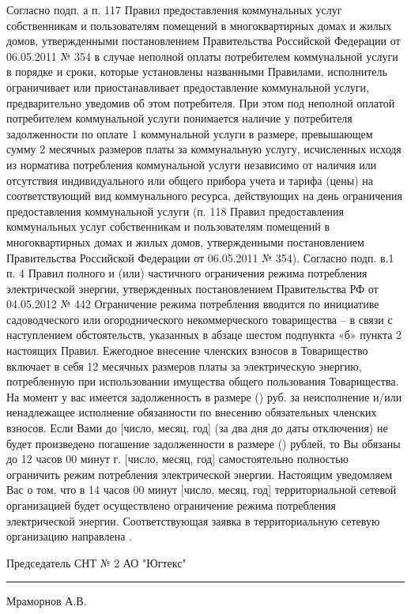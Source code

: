 Согласно подп. а п. 117 Правил предоставления коммунальных услуг собственникам и пользователям помещений в многоквартирных домах и жилых домов, утвержденными постановлением Правительства Российской Федерации от 06.05.2011 № 354 в случае неполной оплаты потребителем коммунальной услуги в порядке и сроки, которые установлены названными Правилами, исполнитель ограничивает или приостанавливает предоставление коммунальной услуги, предварительно уведомив об этом потребителя.
При этом под неполной оплатой потребителем коммунальной услуги понимается наличие у потребителя задолженности по оплате 1 коммунальной услуги в размере, превышающем сумму 2 месячных размеров платы за коммунальную услугу, исчисленных исходя из норматива потребления коммунальной услуги независимо от наличия или отсутствия индивидуального или общего прибора учета и тарифа (цены) на соответствующий вид коммунального ресурса, действующих на день ограничения предоставления коммунальной услуги (п. 118 Правил предоставления коммунальных услуг собственникам и пользователям помещений в многоквартирных домах и жилых домов, утвержденными постановлением Правительства Российской Федерации от 06.05.2011 № 354).
Согласно подп. в.1 п. 4 Правил полного и (или) частичного ограничения режима потребления электрической энергии, утвержденных постановлением Правительства РФ от 04.05.2012 № 442 Ограничение режима потребления вводится по инициативе садоводческого или огороднического некоммерческого товарищества – в связи с наступлением обстоятельств, указанных в абзаце шестом подпункта «б» пункта 2 настоящих Правил.
Ежегодное внесение членских взносов в Товарищество включает в себя 12 месячных размеров платы за электрическую энергию, потребленную при использовании имущества общего пользования Товарищества. 
На момент         у вас имеется задолженность в размере    () руб. за неисполнение и/или ненадлежащее исполнение обязанности по внесению  обязательных членских взносов. 
Если Вами до           [число, месяц, год] (за два дня до даты отключения) не будет произведено погашение задолженности в размере  ()            рублей, то Вы обязаны до 12 часов 00 минут  г.        [число, месяц, год]  самостоятельно полностью ограничить режим потребления электрической энергии. 
Настоящим уведомляем Вас о том, что в 14 часов 00 минут     [число, месяц, год]  территориальной сетевой организацией будет осуществлено ограничение режима потребления электрической энергии. 
Соответствующая заявка в территориальную сетевую организацию направлена  .

\vspace{5mm}



\vspace{15mm}
\noindent Председатель СНТ № 2 АО "Югтекс" \hfill    \rule{3cm}{0.1 mm}    Мраморнов А.В.